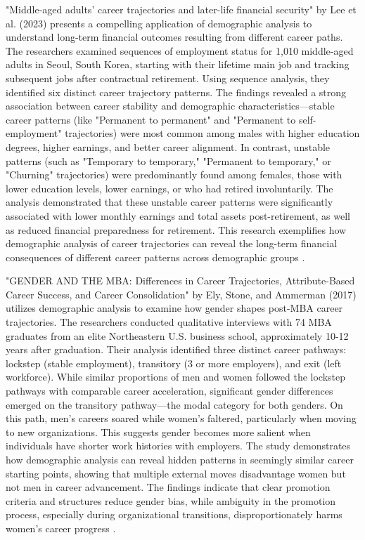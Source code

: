\documentclass[../main.tex]{subfiles}
\begin{document}
"Middle-aged adults' career trajectories and later-life financial security" by Lee et al. (2023) presents a compelling application of demographic analysis to understand long-term financial outcomes resulting from different career paths. The researchers examined sequences of employment status for 1,010 middle-aged adults in Seoul, South Korea, starting with their lifetime main job and tracking subsequent jobs after contractual retirement. Using sequence analysis, they identified six distinct career trajectory patterns. The findings revealed a strong association between career stability and demographic characteristics—stable career patterns (like "Permanent to permanent" and "Permanent to self-employment" trajectories) were most common among males with higher education degrees, higher earnings, and better career alignment. In contrast, unstable patterns (such as "Temporary to temporary," "Permanent to temporary," or "Churning" trajectories) were predominantly found among females, those with lower education levels, lower earnings, or who had retired involuntarily. The analysis demonstrated that these unstable career patterns were significantly associated with lower monthly earnings and total assets post-retirement, as well as reduced financial preparedness for retirement. This research exemplifies how demographic analysis of career trajectories can reveal the long-term financial consequences of different career patterns across demographic groups \parencite{lee2023middle}.

"GENDER AND THE MBA: Differences in Career Trajectories, Attribute-Based Career Success, and Career Consolidation" by Ely, Stone, and Ammerman (2017) utilizes demographic analysis to examine how gender shapes post-MBA career trajectories. The researchers conducted qualitative interviews with 74 MBA graduates from an elite Northeastern U.S. business school, approximately 10-12 years after graduation. Their analysis identified three distinct career pathways: lockstep (stable employment), transitory (3 or more employers), and exit (left workforce). While similar proportions of men and women followed the lockstep pathways with comparable career acceleration, significant gender differences emerged on the transitory pathway—the modal category for both genders. On this path, men's careers soared while women's faltered, particularly when moving to new organizations. This suggests gender becomes more salient when individuals have shorter work histories with employers. The study demonstrates how demographic analysis can reveal hidden patterns in seemingly similar career starting points, showing that multiple external moves disadvantage women but not men in career advancement. The findings indicate that clear promotion criteria and structures reduce gender bias, while ambiguity in the promotion process, especially during organizational transitions, disproportionately harms women's career progress \parencite{ely2017gender}.
\end{document}

